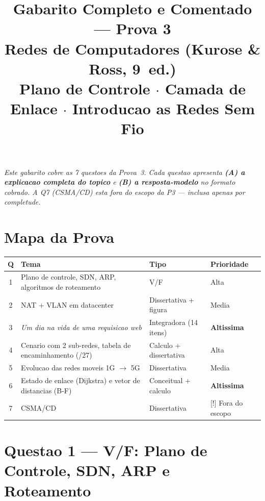 \documentclass[11pt,a4paper]{article}
\title{\textbf{Gabarito Completo e Comentado --- Prova 3}\\
\large Redes de Computadores (Kurose \& Ross, 9\textordfeminine\ ed.)\\
\normalsize Plano de Controle $\cdot$ Camada de Enlace $\cdot$ Introducao as Redes Sem Fio}
\author{}
\date{}
\begin{document}
\maketitle
\thispagestyle{fancy}

\noindent\textit{Este gabarito cobre as 7 questoes da Prova~3. Cada questao apresenta \textbf{(A) a explicacao completa do topico} e \textbf{(B) a resposta-modelo} no formato cobrado. A Q7 (CSMA/CD) esta fora do escopo da P3 --- inclusa apenas por completude.}

\section*{Mapa da Prova}

\begin{center}
\begin{tabular}{clll}
\toprule
\textbf{Q} & \textbf{Tema} & \textbf{Tipo} & \textbf{Prioridade} \\
\midrule
1 & Plano de controle, SDN, ARP, algoritmos de roteamento & V/F & Alta \\
2 & NAT + VLAN em datacenter & Dissertativa + figura & Media \\
3 & \textit{Um dia na vida de uma requisicao web} & Integradora (14 itens) & \textbf{Altissima} \\
4 & Cenario com 2 sub-redes, tabela de encaminhamento (/27) & Calculo + dissertativa & Alta \\
5 & Evolucao das redes moveis 1G $\to$ 5G & Dissertativa & Media \\
6 & Estado de enlace (Dijkstra) e vetor de distancias (B-F) & Conceitual + calculo & \textbf{Altissima} \\
7 & CSMA/CD & Dissertativa & {[}!{]} Fora do escopo \\
\bottomrule
\end{tabular}
\end{center}

\hrulefill

\section*{Questao 1 --- V/F: Plano de Controle, SDN, ARP e Roteamento}
\end{document}
